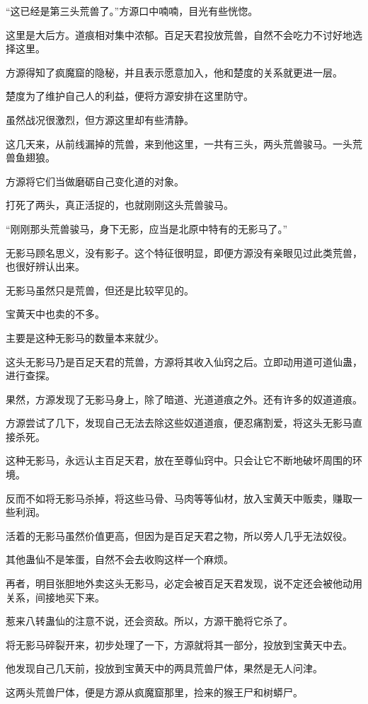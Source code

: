 \begin{this_body}
“这已经是第三头荒兽了。”方源口中喃喃，目光有些恍惚。

这里是大后方。道痕相对集中浓郁。百足天君投放荒兽，自然不会吃力不讨好地选择这里。

方源得知了疯魔窟的隐秘，并且表示愿意加入，他和楚度的关系就更进一层。

楚度为了维护自己人的利益，便将方源安排在这里防守。

虽然战况很激烈，但方源这里却有些清静。

这几天来，从前线漏掉的荒兽，来到他这里，一共有三头，两头荒兽骏马。一头荒兽鱼翅狼。

方源将它们当做磨砺自己变化道的对象。

打死了两头，真正活捉的，也就刚刚这头荒兽骏马。

“刚刚那头荒兽骏马，身下无影，应当是北原中特有的无影马了。”

无影马顾名思义，没有影子。这个特征很明显，即便方源没有亲眼见过此类荒兽，也很好辨认出来。

无影马虽然只是荒兽，但还是比较罕见的。

宝黄天中也卖的不多。

主要是这种无影马的数量本来就少。

这头无影马乃是百足天君的荒兽，方源将其收入仙窍之后。立即动用道可道仙蛊，进行查探。

果然，方源发现了无影马身上，除了暗道、光道道痕之外。还有许多的奴道道痕。

方源尝试了几下，发现自己无法去除这些奴道道痕，便忍痛割爱，将这头无影马直接杀死。

这种无影马，永远认主百足天君，放在至尊仙窍中。只会让它不断地破坏周围的环境。

反而不如将无影马杀掉，将这些马骨、马肉等等仙材，放入宝黄天中贩卖，赚取一些利润。

活着的无影马虽然价值更高，但因为是百足天君之物，所以旁人几乎无法奴役。

其他蛊仙不是笨蛋，自然不会去收购这样一个麻烦。

再者，明目张胆地外卖这头无影马，必定会被百足天君发现，说不定还会被他动用关系，间接地买下来。

惹来八转蛊仙的注意不说，还会资敌。所以，方源干脆将它杀了。

将无影马碎裂开来，初步处理了一下，方源就将其一部分，投放到宝黄天中去。

他发现自己几天前，投放到宝黄天中的两具荒兽尸体，果然是无人问津。

这两头荒兽尸体，便是方源从疯魔窟那里，捡来的猴王尸和树蟒尸。


\end{this_body}
